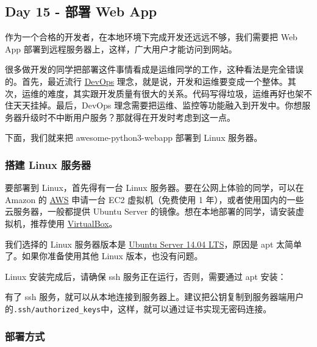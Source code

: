 \hypertarget{day-15---ux90e8ux7f72-web-app}{%
\subsection{Day 15 - 部署 Web App}\label{day-15---ux90e8ux7f72-web-app}}

作为一个合格的开发者，在本地环境下完成开发还远远不够，我们需要把 Web App
部署到远程服务器上，这样，广大用户才能访问到网站。

很多做开发的同学把部署这件事情看成是运维同学的工作，这种看法是完全错误的。首先，最近流行
\href{http://zh.wikipedia.org/wiki/DevOps}{DevOps}
理念，就是说，开发和运维要变成一个整体。其次，运维的难度，其实跟开发质量有很大的关系。代码写得垃圾，运维再好也架不住天天挂掉。最后，DevOps
理念需要把运维、监控等功能融入到开发中。你想服务器升级时不中断用户服务？那就得在开发时考虑到这一点。

下面，我们就来把 awesome-python3-webapp 部署到 Linux 服务器。

\hypertarget{ux642dux5efa-linux-ux670dux52a1ux5668}{%
\subsubsection{搭建 Linux
服务器}\label{ux642dux5efa-linux-ux670dux52a1ux5668}}

要部署到 Linux，首先得有一台 Linux 服务器。要在公网上体验的同学，可以在
Amazon 的 \href{http://aws.amazon.com/}{AWS} 申请一台 EC2
虚拟机（免费使用 1 年），或者使用国内的一些云服务器，一般都提供 Ubuntu
Server 的镜像。想在本地部署的同学，请安装虚拟机，推荐使用
\href{https://www.virtualbox.org/}{VirtualBox}。

我们选择的 Linux 服务器版本是
\href{http://www.ubuntu.com/download/server}{Ubuntu Server 14.04
LTS}，原因是 apt 太简单了。如果你准备使用其他 Linux 版本，也没有问题。

Linux 安装完成后，请确保 ssh 服务正在运行，否则，需要通过 apt 安装：


有了 ssh
服务，就可以从本地连接到服务器上。建议把公钥复制到服务器端用户的\texttt{.ssh/authorized\_keys}中，这样，就可以通过证书实现无密码连接。

\hypertarget{ux90e8ux7f72ux65b9ux5f0f}{%
\subsubsection{部署方式}\label{ux90e8ux7f72ux65b9ux5f0f}}

